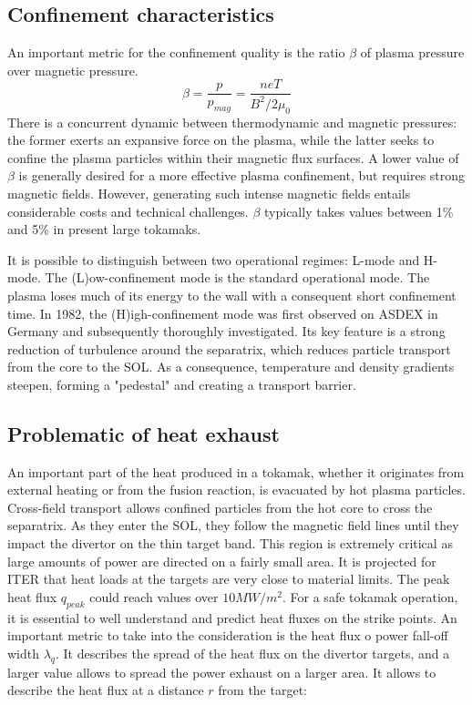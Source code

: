 \subsection{Confinement characteristics}
An important metric for the confinement quality is the ratio $\beta$ of plasma pressure over magnetic pressure.
\begin{equation}
	\label{eq:PlasmaBeta}
	\beta = \frac{p}{p_{mag}} = \frac{neT}{B^2/2\mu_0}
\end{equation}
There is a concurrent dynamic between thermodynamic and magnetic pressures: the former exerts an expansive force on the plasma, while the latter seeks to confine the plasma particles within their magnetic flux surfaces. A lower value of $\beta$ is generally desired for a more effective plasma confinement, but requires strong magnetic fields. However, generating such intense magnetic fields entails considerable costs and technical challenges. $\beta$ typically takes values between 1\% and 5\% in present large tokamaks. 

It is possible to distinguish between two operational regimes: L-mode and H-mode. The (L)ow-confinement mode is the standard operational mode. The plasma loses much of its energy to the wall with a consequent short confinement time. In 1982, the (H)igh-confinement mode was first observed on ASDEX in Germany and subsequently thoroughly investigated\cite{asdex1989h}. Its key feature is a strong reduction of turbulence around the separatrix, which reduces particle transport from the core to the SOL. As a consequence, temperature and density gradients steepen, forming a "pedestal" and creating a transport barrier. 

\subsection{Problematic of heat exhaust}

An important part of the heat produced in a tokamak, whether it originates from external heating or from the fusion reaction, is evacuated by hot plasma particles. Cross-field transport allows confined particles from the hot core to cross the separatrix. As they enter the SOL, they follow the magnetic field lines until they impact the divertor on the thin target band. This region is extremely critical as large amounts of power are directed on a fairly small area. It is projected for ITER that heat loads at the targets are very close to material limits\cite{gunn2017surface}. The peak heat flux $q_{peak}$ could reach values over $10MW/m^2$. For a safe tokamak operation, it is essential to well understand and predict heat fluxes on the strike points. An important metric to take into the consideration is the heat flux o power fall-off width $\lambda_q$. It describes the spread of the heat flux on the divertor targets, and a larger value allows to spread the power exhaust on a larger area. It allows to describe the heat flux at a distance $r$ from the target:

